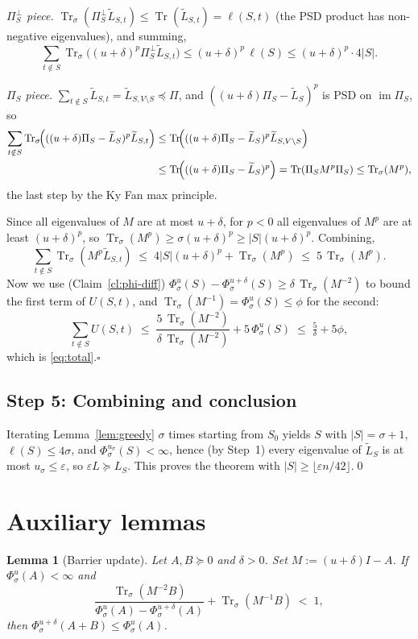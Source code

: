 \documentclass[11pt]{article}
\newcommand{\eps}{\varepsilon}
\newcommand{\Tr}{\operatorname{Tr}}
\newcommand{\Trs}{\operatorname{Tr}_{\sigma}}
\newcommand{\del}{\delta}
\DeclareMathOperator{\im}{im}
\newcommand{\tL}{\widetilde{L}}
\newtheorem{lemma}[theorem]{Lemma}
\begin{document}
\smallskip
\emph{$\Pi_S^\perp$ piece.}\quad
$\Trs(\Pi_S^\perp\tL_{S,t})\le\Tr(\tL_{S,t})=\ell(S,t)$ (the PSD product has
non-negative eigenvalues), and summing,
\[
  \sum_{t\notin S}\Trs\!\bigl((u+\del)^p\Pi_S^\perp\tL_{S,t}\bigr)
   \le (u+\del)^p\,\ell(S)\le (u+\del)^p\cdot 4|S|.
\]

\smallskip
\emph{$\Pi_S$ piece.}\quad
$\sum_{t\notin S}\tL_{S,t}=\tL_{S,V\setminus S}\preceq\Pi$, and
$((u+\del)\Pi_S-\tL_S)^p$ is PSD on $\im\Pi_S$, so
\[
\begin{aligned}
\sum_{t\notin S}\Trs\!\Bigl(((u+\del)\Pi_S-\tL_S)^p\tL_{S,t}\Bigr)
  &\le \Tr\!\Bigl(((u+\del)\Pi_S-\tL_S)^p\tL_{S,V\setminus S}\Bigr)\\
  &\le \Tr\!\Bigl(((u+\del)\Pi_S-\tL_S)^p\Bigr)
   = \Tr(\Pi_S M^p\Pi_S) \le \Trs(M^p),
\end{aligned}
\]
the last step by the Ky Fan max principle.

\smallskip
Since all eigenvalues of $M$ are at most $u+\del$, for $p<0$ all eigenvalues of
$M^p$ are at least $(u+\del)^p$, so $\Trs(M^p)\ge\sigma(u+\del)^p\ge|S|(u+\del)^p$.
Combining,
\[
  \sum_{t\notin S}\Trs(M^p\tL_{S,t}) \;\le\; 4|S|(u+\del)^p + \Trs(M^p)
   \;\le\; 5\,\Trs(M^p).
\]
Now we use (Claim~\ref{cl:phi-diff})
$\Phi^u_\sigma(S)-\Phi^{u+\del}_\sigma(S)\ge\del\,\Trs(M^{-2})$ to bound the
first term of $U(S,t)$, and $\Trs(M^{-1})=\Phi^u_\sigma(S)\le\phi$ for the
second:
\[
  \sum_{t\notin S}U(S,t)
   \;\le\; \frac{5\,\Trs(M^{-2})}{\del\,\Trs(M^{-2})} + 5\,\Phi^u_\sigma(S)
   \;\le\; \tfrac{5}{\del}+5\phi,
\]
which is \eqref{eq:total}.\hfill$\square$

\subsection*{Step 5: Combining and conclusion}

Iterating Lemma~\ref{lem:greedy} $\sigma$ times starting from $S_0$ yields
$S$ with $|S|=\sigma+1$, $\ell(S)\le 4\sigma$, and
$\Phi^{u_\sigma}_\sigma(S)<\infty$, hence (by Step~1) every eigenvalue of
$\tL_S$ is at most $u_\sigma\le\eps$, so $\eps L\succeq L_S$. This proves the
theorem with $|S|\ge\lfloor\eps n/42\rfloor$.\qed

\section*{Auxiliary lemmas}

\begin{lemma}[Barrier update]\label{lem:bu}
Let $A,B\succeq 0$ and $\del>0$. Set $M:=(u+\del)I-A$. If
$\Phi^u_\sigma(A)<\infty$ and
\[
  \frac{\Trs(M^{-2}B)}{\Phi^u_\sigma(A)-\Phi^{u+\del}_\sigma(A)}
   + \Trs(M^{-1}B) \;<\; 1,
\]
then $\Phi^{u+\del}_\sigma(A+B)\le\Phi^u_\sigma(A)$.
\end{lemma}
\end{document}
